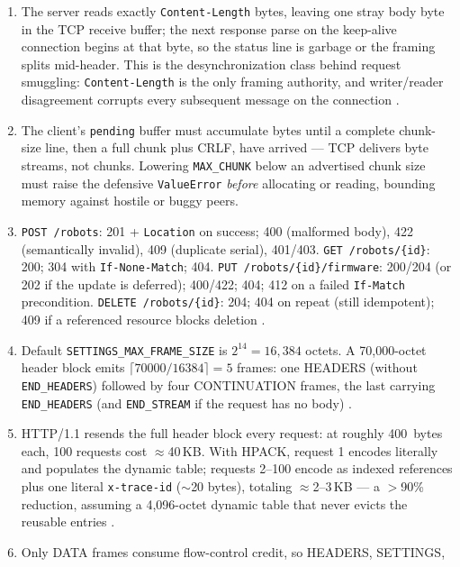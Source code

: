 \begin{enumerate}[label=\textbf{E1.\arabic*}, leftmargin=3.2em]
  \item The server reads exactly \texttt{Content-Length} bytes, leaving one
    stray body byte in the TCP receive buffer; the next response parse on the
    keep-alive connection begins at that byte, so the status line is garbage
    or the framing splits mid-header. This is the desynchronization class
    behind request smuggling: \texttt{Content-Length} is the only framing
    authority, and writer/reader disagreement corrupts every subsequent
    message on the connection \cite{rfc9112}.
  \item The client's \texttt{pending} buffer must accumulate bytes until a
    complete chunk-size line, then a full chunk plus CRLF, have arrived ---
    TCP delivers byte streams, not chunks. Lowering \texttt{MAX\_CHUNK}
    below an advertised chunk size must raise the defensive
    \texttt{ValueError} \emph{before} allocating or reading, bounding memory
    against hostile or buggy peers.
  \item \texttt{POST /robots}: 201 + \texttt{Location} on success; 400
    (malformed body), 422 (semantically invalid), 409 (duplicate serial),
    401/403. \texttt{GET /robots/\{id\}}: 200; 304 with
    \texttt{If-None-Match}; 404. \texttt{PUT /robots/\{id\}/firmware}:
    200/204 (or 202 if the update is deferred); 400/422; 404; 412 on a
    failed \texttt{If-Match} precondition. \texttt{DELETE
    /robots/\{id\}}: 204; 404 on repeat (still idempotent); 409 if a
    referenced resource blocks deletion \cite{rfc9110}.
  \item Default \texttt{SETTINGS\_MAX\_FRAME\_SIZE} is $2^{14}=16{,}384$
    octets. A 70{,}000-octet header block emits $\lceil 70000/16384\rceil =
    5$ frames: one HEADERS (without \texttt{END\_HEADERS}) followed by four
    CONTINUATION frames, the last carrying \texttt{END\_HEADERS} (and
    \texttt{END\_STREAM} if the request has no body)
    \cite{rfc9113}.
  \item HTTP/1.1 resends the full header block every request: at roughly
    400~bytes each, 100 requests cost $\approx$40\,KB. With HPACK, request
    1 encodes literally and populates the dynamic table; requests 2--100
    encode as indexed references plus one literal \texttt{x-trace-id}
    ($\sim$20 bytes), totaling $\approx$2--3\,KB --- a $>$90\% reduction,
    assuming a 4{,}096-octet dynamic table that never evicts the reusable
    entries \cite{rfc7541}.
  \item Only DATA frames consume flow-control credit, so HEADERS, SETTINGS,

\end{enumerate}
